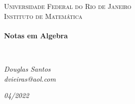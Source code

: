 \begin{titlepage}
\begin{center}
\textsc{\Large Universidade Federal do Rio de Janeiro}\\
\textsc{\large Instituto de Matemática}\\[1.5cm]
\LinhaR \\[0.4cm]
{ \LARGE \bfseries Notas em Algebra \\[0.4cm]}

\LinhaR \\[1.4cm]

\noindent
\begin{minipage}{0.4\textwidth}
\begin{center} \large
\emph{Douglas Santos}\\
\itshape{dvieiras@aol.com}
\end{center}
\end{minipage}

\begin{center}
\end{center}

\vfill
{\large \textit{04/2022}}

\end{center}
\end{titlepage}
\clearpage